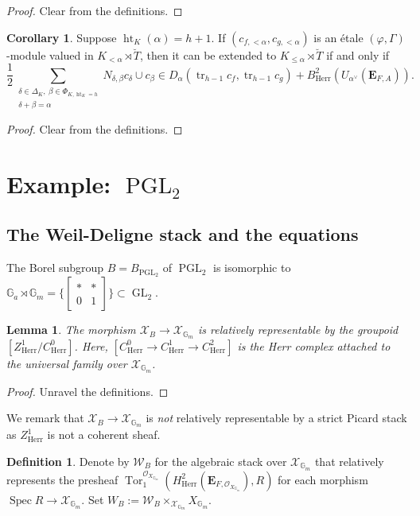 \documentclass[11pt]{amsart}
\newtheorem{lem}[thm]{Lemma}
\theoremstyle{definition}
\newtheorem{cor}[thm]{Corollary}
\newtheorem{defn}[thm]{Definition}
\newcommand{\G}{\mathbb{G}}
\newcommand{\bfE}{\mathbf{E}}
\newcommand{\cO}{\mathcal{O}}
\newcommand{\cX}{\mathcal{X}}
\newcommand{\cW}{\mathcal{W}}
\newcommand{\bT}{\breve{T}}
\DeclareMathOperator{\PGL}{PGL}
\DeclareMathOperator{\Ht}{ht}
\DeclareMathOperator{\GL}{GL}
\DeclareMathOperator{\tr}{tr}
\DeclareMathOperator{\Spec}{Spec}
\DeclareMathOperator{\Tor}{Tor}
\newcommand{\Herr}{\mathrm{Herr}}
\begin{document}
\begin{proof}
Clear from the definitions.
\end{proof}


\begin{cor}
Suppose $\Ht_K(\alpha)=h+1$.
If $(c_{f, <\alpha}, c_{g, <\alpha})$
is an \'etale $(\varphi, \Gamma)$-module
valued in $K_{<\alpha}\rtimes \bT$,
then
it can be extended to $K_{\le \alpha}\rtimes \bT$
if and only if
\[
\frac{1}{2}\sum_{\substack{\delta\in \Delta_K,\ \beta\in \Phi_{K, \Ht_K=h}\\
\delta+\beta=\alpha}}
N_{\delta, \beta} c_\delta\cup c_\beta
\in D_\alpha(\tr_{h-1}c_f, \tr_{h-1}c_g) + B^2_{\Herr}(U_{\alpha^\vee}(\bfE_{F, A})).
\]
\label{cor:nonab-herr-2}
\end{cor}

\begin{proof}
Clear from the definitions.
\end{proof}

\section{Example: $\PGL_2$}

\subsection{The Weil-Deligne stack
and the equations}

The Borel subgroup $B=B_{\PGL_2}$ of $\PGL_2$
is isomorphic to $\G_a\rtimes \G_m
=\{
\begin{bmatrix}
* & * \\
0 & 1
\end{bmatrix}
\}
\subset \GL_2$.

\begin{lem}
\rm
The morphism $\cX_B\to \cX_{\G_m}$
is relatively representable by the groupoid
$[Z_\Herr^1/C_\Herr^0]$.
Here, $[C_\Herr^0\to C_\Herr^1\to C_\Herr^2]$ 
is the Herr complex attached to the universal family over
$\cX_{\G_m}$.

\end{lem}

\begin{proof}
Unravel the definitions.
\end{proof}

We remark that $\cX_B\to \cX_{\G_m}$
is {\it not} relatively representable by a strict Picard stack
as $Z_\Herr^1$ is not a coherent sheaf.

\begin{defn}
\label{def:WD-PGL2}
Denote by $\cW_B$
for the algebraic stack over $\cX_{\G_m}$
that relatively represents the presheaf 
$\Tor_1^{\cO_{X_{\G_m}}}(H^2_\Herr(\bfE_{F, \cO_{X_{\G_m}}}), R)$
for each morphism $\Spec R\to\cX_{\G_m}$.
Set $W_B:=\cW_B\times_{\cX_{\G_m}}X_{\G_m}$.
\end{defn}
\end{document}
